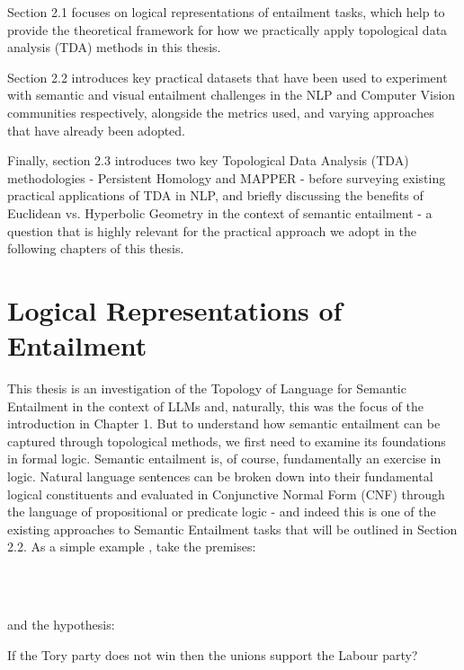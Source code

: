 \documentclass[12pt,twoside]{report}
\begin{document}
Section 2.1 focuses on logical representations of entailment tasks, which help to provide the theoretical framework for how we practically apply topological data analysis (TDA) methods in this thesis. \par \quad Section 2.2 introduces key practical datasets that have been used to experiment with semantic and visual entailment challenges in the NLP and Computer Vision communities respectively, alongside the metrics used, and varying approaches that have already been adopted.  \par \quad Finally, section 2.3 introduces two key Topological Data Analysis (TDA) methodologies - Persistent Homology and MAPPER - before surveying existing practical applications of TDA in NLP, and briefly discussing the benefits of Euclidean vs. Hyperbolic Geometry in the context of semantic entailment - a question that is highly relevant for the practical approach we adopt in the following chapters of this thesis. 

\section{Logical Representations of Entailment}

This thesis is an investigation of the Topology of Language for Semantic Entailment in the context of LLMs and, naturally, this was the focus of the introduction in Chapter 1. But to understand how semantic entailment can be captured through topological methods, we first need to examine its foundations in formal logic. Semantic entailment is, of course, fundamentally an exercise in logic. Natural language sentences can be broken down into their fundamental logical constituents and evaluated in Conjunctive Normal Form (CNF) through the language of propositional or predicate logic - and indeed this is one of the existing approaches to Semantic Entailment tasks that will be outlined in Section 2.2. As a simple example \cite{fSadri}, take the premises: 
\begin{flushleft}
 \\
 \\

\end{flushleft}

\par and the hypothesis:
\begin{flushleft}
If the Tory party does not win then the unions
support the Labour party?    
\end{flushleft}
\end{document}
